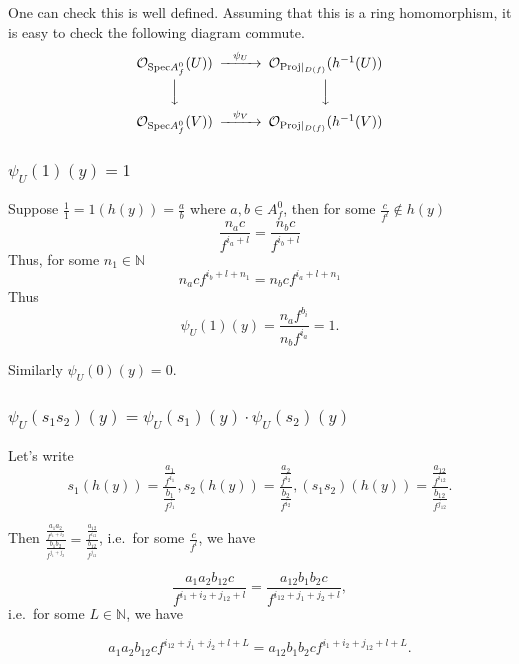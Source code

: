 \documentclass[11pt]{article}
\begin{document}
    One can check this is well defined. Assuming that this is a ring
homomorphism, it is easy to check the following diagram commute. 
\[
\begin{CD} 
\mathcal O_{\mathrm{Spec}A^0_f}(U)) @>{\psi_U}>> \mathcal O_{\mathrm{Proj}\mid_{D(f)}}(h^{-1}(U)) \\
@VVV                                                           @VVV                              \\
\mathcal O_{\mathrm{Spec}A^0_f}(V)) @>{\psi_V}>> \mathcal O_{\mathrm{Proj}\mid_{D(f)}}(h^{-1}(V))
\end{CD}\\ 
\]

    \hypertarget{psi_u1y1}{%
\subsubsection{\texorpdfstring{\(\psi_U(1)(y)=1\)}{\textbackslash psi\_U(1)(y)=1}}\label{psi_u1y1}}

Suppose \(\frac11=1(h(y))=\frac a b\) where \(a,b\in A^0_f\), then for
some \(\frac c{f^l}\not\in h(y)\) \[
\frac {n_ac}{f^{i_a+l}}=\frac {n_bc}{f^{i_b+l}}
\] Thus, for some \(n_1\in\mathbb N\) \[
n_acf^{i_b+l+n_1}=n_bcf^{i_a+l+n_1}
\] Thus \[
\psi_U(1)(y)=\frac{n_af^{b_i}}{n_bf^{i_a}}=1.
\]

Similarly \(\psi_U(0)(y)=0\).

    \hypertarget{psi_us_1s_2ypsi_us_1ycdotpsi_us_2y}{%
\subsubsection{\texorpdfstring{\(\psi_U(s_1s_2)(y)=\psi_U(s_1)(y)\cdot\psi_U(s_2)(y)\)}{\textbackslash psi\_U(s\_1s\_2)(y)=\textbackslash psi\_U(s\_1)(y)\textbackslash cdot\textbackslash psi\_U(s\_2)(y)}}\label{psi_us_1s_2ypsi_us_1ycdotpsi_us_2y}}

Let's write \[
s_1(h(y))=\frac{\frac{a_1}{f^{i_1}}}{\frac{b_1}{f^{j_1}}}, s_2(h(y))=\frac{\frac{a_2}{f^{i_2}}}{\frac{b_2}{f^{i_2}}}, (s_1s_2)(h(y))=\frac{\frac{a_{12}}{f^{i_{12}}}}{\frac{b_{12}}{f^{j_{12}}}}.
\]

Then
\(\frac{\frac{a_1a_2}{f^{i_1+i_2}}}{\frac{b_1b_2}{f^{j_1+j_2}}}=\frac{\frac{a_{12}}{f^{i_{12}}}}{\frac{b_{12}}{f^{j_{12}}}}\),
i.e.~for some \(\frac{c}{f^l}\), we have

\[
\frac{a_1a_2b_{12}c}{f^{i_1+i_2+j_{12}+l}}=\frac{a_{12}b_1b_2c}{f^{i_{12}+j_1+j_2+l}},
\] i.e.~for some \(L\in\mathbb N\), we have

\[
a_1a_2b_{12}cf^{i_{12}+j_1+j_2+l+L}=a_{12}b_1b_2cf^{i_1+i_2+j_{12}+l+L}.
\]
\end{document}
